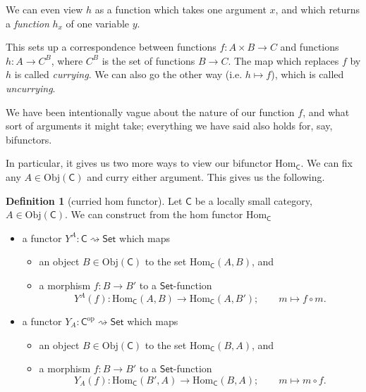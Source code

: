 \documentclass[a4paper]{report}
\newcommand{\Obj}{\mathrm{Obj}}
\newcommand{\Hom}{\mathrm{Hom}}
\theoremstyle{definition}
\newtheorem{definition}{Definition}[section]
\theoremstyle{plain}
\theoremstyle{remark}
\begin{document}
We can even view $h$ as a function which takes one argument $x$, and which returns a \emph{function} $h_{x}$ of one variable $y$.

This sets up a correspondence between functions $f\colon A \times B \to C$ and functions $h\colon A \to C^{B}$, where $C^{B}$ is the set of functions $B \to C$. The map which replaces $f$ by $h$ is called \emph{currying}. We can also go the other way (i.e. $h \mapsto f$), which is called \emph{uncurrying}.

We have been intentionally vague about the nature of our function $f$, and what sort of arguments it might take; everything we have said also holds for, say, bifunctors.

In particular, it gives us two more ways to view our bifunctor $\Hom_{\mathsf{C}}$. We can fix any $A \in \Obj(\mathsf{C})$ and curry either argument. This gives us the following.

\begin{definition}[curried hom functor]
  \label{def:curriedhomfunctor}
  Let $\mathsf{C}$ be a locally small category, $A \in \Obj(\mathsf{C})$. We can construct from the hom functor $\Hom_{\mathsf{C}}$
  \begin{itemize}
    \item a functor $Y^{A}\colon \mathsf{C} \rightsquigarrow \mathsf{Set}$ which maps
      \begin{itemize}
        \item an object $B \in \Obj(\mathsf{C})$ to the set $\Hom_{\mathsf{C}}(A, B)$, and

        \item a morphism $f\colon B \to B'$ to a $\mathsf{Set}$-function
          \begin{equation*}
            Y^{A}(f)\colon \Hom_{\mathsf{C}}(A, B) \to \Hom_{\mathsf{C}}(A, B'); \qquad m \mapsto f \circ m.
          \end{equation*} 
      \end{itemize}

    \item a functor $Y_{A}\colon \mathsf{C}^{\mathrm{op}} \rightsquigarrow \mathsf{Set}$ which maps
      \begin{itemize}
        \item an object $B \in \Obj(\mathsf{C})$ to the set $\Hom_{\mathsf{C}}(B, A)$, and

        \item a morphism $f\colon B \to B'$ to a $\mathsf{Set}$-function
          \begin{equation*}
            Y_{A}(f)\colon \Hom_{\mathsf{C}}(B', A) \to \Hom_{\mathsf{C}}(B, A); \qquad m \mapsto m \circ f.
          \end{equation*} 
      \end{itemize}
  \end{itemize}
\end{definition}
\end{document}
